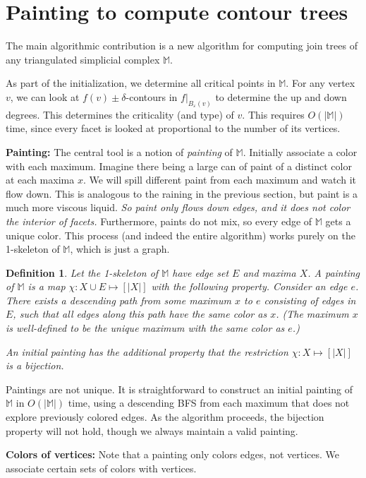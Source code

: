 \documentclass[11pt]{article}
\newtheorem{definition}[theorem]{Definition}
\theoremstyle{definition}
\newcommand{\MM}{\mathbb{M}}
\newcommand{\eps}{\varepsilon}
\begin{document}
\section{Painting to compute contour trees}

The main algorithmic contribution is a new algorithm for computing join trees of any triangulated simplicial
complex $\MM$.

As part of the initialization, we determine
all critical points in $\MM$. For any vertex $v$, we can look at $f(v) \pm \delta$-contours 
in $f|_{B_\eps(v)}$ to determine the up and down degrees. This determines the criticality (and type)
of $v$. This requires $O(|\MM|)$ time, since every facet is looked at proportional to the number of its
vertices.

{\bf Painting:} The central tool is a notion 
of \emph{painting} of $\MM$. Initially associate a color with each maximum. Imagine there being a large
can of paint of a distinct color at each maxima $x$. We will spill different paint from each maximum and watch it flow down.
This is analogous to the raining in the previous section, but paint is a much more viscous liquid.
\emph{So paint only flows down edges, and it does not color the interior of facets.} Furthermore, paints
do not mix, so every edge of $\MM$ gets a unique color. This process (and indeed the entire algorithm)
works purely on the 1-skeleton of $\MM$, which is just a graph.
%
\begin{definition} \label{def:paint} Let the 1-skeleton of $\MM$ have edge set $E$ and maxima $X$.
A  \emph{painting} of $\MM$ is a map $\chi:X \cup E \mapsto [|X|]$ with the following property. 
 Consider an edge $e$. There exists a descending path from some maximum $x$ to $e$
	consisting of edges in $E$, such that all edges along this path have the same color as $x$. (The maximum $x$
	is well-defined to be the unique maximum with the same color as $e$.)

An \emph{initial} painting has the additional property that the restriction $\chi:X \mapsto [|X|]$ is a bijection.
\end{definition}
%
Paintings are not unique. It is straightforward to construct an initial painting of $\MM$ in $O(|\MM|)$ time, 
using a descending BFS from each maximum that does not explore previously colored edges. 
As the algorithm proceeds, the bijection property will not hold, though we always maintain a valid painting.

{\bf Colors of vertices:} Note that a painting only colors edges, not vertices. We associate certain
sets of colors with vertices.
\end{document}
